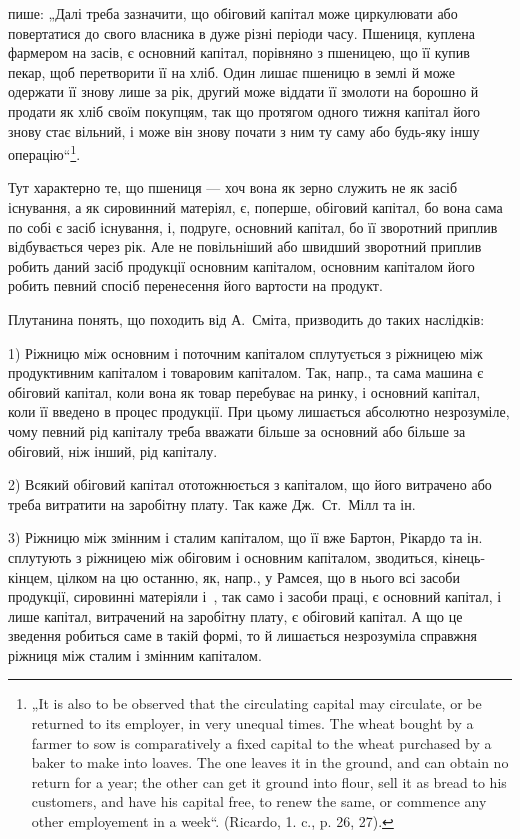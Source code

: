 \parcont{}  %
пише: „Далі треба зазначити, що обіговий капітал може циркулювати
або повертатися до свого власника в дуже різні періоди часу. Пшениця,
куплена фармером на засів, є основний капітал, порівняно з пшеницею,
що її купив пекар, щоб перетворити її на хліб. Один лишає пшеницю
в землі й може одержати її знову лише за рік, другий може віддати її
змолоти на борошно й продати як хліб своїм покупцям, так що протягом
одного тижня капітал його знову стає вільний, і може він знову почати
з ним ту саму або будь-яку іншу операцію“\footnote{
„It is also to be observed that the circulating capital may circulate, or be
returned to its employer, in very unequal times. The wheat bought by a farmer to
sow is comparatively a fixed capital to the wheat purchased by a baker to make
into loaves. The one leaves it in the ground, and can obtain no return for a year; the
other can get it ground into flour, sell it as bread to his customers, and have his capital
free, to renew the same, or commence any other employement in a week“. (Ricardo,
1. c., p. 26, 27).
}.

Тут характерно те, що пшениця — хоч вона як зерно служить не як
засіб існування, а як сировинний матеріял, є, поперше, обіговий капітал,
бо вона сама по собі є засіб існування, і, подруге, основний капітал, бо
її зворотний приплив відбувається через рік. Але не повільніший або
швидший зворотний приплив робить даний засіб продукції основним капіталом,
основним капіталом його робить певний спосіб перенесення його
вартости на продукт.

Плутанина понять, що походить від А.~Сміта, призводить до таких
наслідків:

1) Ріжницю між основним і поточним капіталом сплутується з ріжницею
між продуктивним капіталом і товаровим капіталом. Так, напр.,
та сама машина є обіговий капітал, коли вона як товар перебуває на
ринку, і основний капітал, коли її введено в процес продукції. При
цьому лишається абсолютно незрозуміле, чому певний рід капіталу треба
вважати більше за основний або більше за обіговий, ніж інший, рід капіталу.

2) Всякий обіговий капітал ототожнюється з капіталом, що його витрачено
або треба витратити на заробітну плату. Так каже Дж.~Ст.~Мілл та ін.

3) Ріжницю між змінним і сталим капіталом, що її вже Бартон, Рікардо
та ін. сплутують з ріжницею між обіговим і основним капіталом, зводиться,
кінець-кінцем, цілком на цю останню, як, напр., у Рамсея, що в нього
всі засоби продукції, сировинні матеріяли і~, так само і засоби праці,
є основний капітал, і лише капітал, витрачений на заробітну плату, є
обіговий капітал. А що це зведення робиться саме в такій формі, то й
лишається незрозуміла справжня ріжниця між сталим і змінним капіталом.

